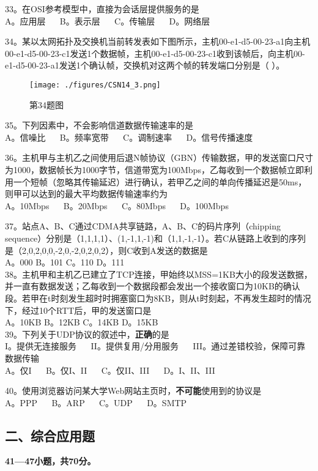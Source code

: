 33。在OSI参考模型中，直接为会话层提供服务的是 \\
A。应用层 $\quad$ B。表示层  $\quad$ C。传输层 $\quad$ D。网络层

34。某以太网拓扑及交换机当前转发表如下图所示，主机00-e1-d5-00-23-a1向主机00-e1-d5-00-23-c1发送1个数据帧，主机00-e1-d5-00-23-c1收到该帧后，向主机00-e1-d5-00-23-a1发送1个确认帧，交换机对这两个帧的转发端口分别是（ ）。
\begin{figure}[ht]
\centering
\texttt{[image: ./figures/CSN14\_3.png]}
\caption{第34题图} \label{CSN14_fig3}
\end{figure}

35。下列因素中，不会影响信道数据传输速率的是 \\
A。信噪比 $\quad$ B。频率宽带 $\quad$ C。调制速率 $\quad$ D。信号传播速度

36。主机甲与主机乙之间使用后退N帧协议（GBN）传输数据，甲的发送窗口尺寸为1000，数据帧长为1000字节，信道带宽为100Mbps，乙每收到一个数据帧立即利用一个短帧（忽略其传输延迟）进行确认，若甲乙之间的单向传播延迟是50ms，则甲可以达到的最大平均数据传输速率约为 \\
A。10Mbps $\quad$ B。20Mbps $\quad$ C。80Mbps $\quad$ D。100Mbps

37。站点A、B、C通过CDMA共享链路，A、B、C的码片序列（chipping sequence）分别是（1,1,1,1）、(1,-1,1,-1)和（1,1,-1,-1）。若C从链路上收到的序列是（2,0,2,0,0,-2,0,-2,0,2,0,2），则C收到A发送的数据是 \\
A。000 B。101 C。110 D。111 \\

38。主机甲和主机乙已建立了TCP连接，甲始终以MSS=1KB大小的段发送数据，并一直有数据发送；乙每收到一个数据段都会发出一个接收窗口为10KB的确认段。若甲在t时刻发生超时时拥塞窗口为8KB，则从t时刻起，不再发生超时的情况下，经过10个RTT后，甲的发送窗口是 \\
A。10KB B。12KB C。14KB D。15KB \\

39。下列关于UDP协议的叙述中，\textbf{正确}的是 \\
I。提供无连接服务 $\quad$ II。提供复用/分用服务 $\quad$ III。通过差错校验，保障可靠数据传输 \\
A。仅I $\quad$ B。仅I、II $\quad$ C。仅II、III $\quad$ D。I、II、III

40。使用浏览器访问某大学Web网站主页时，\textbf{不可能}使用到的协议是 \\
A。PPP $\quad$ B。ARP $\quad$ C。UDP $\quad$ D。SMTP

\subsection{二、综合应用题}
\textbf{41—47小题，共70分。}

